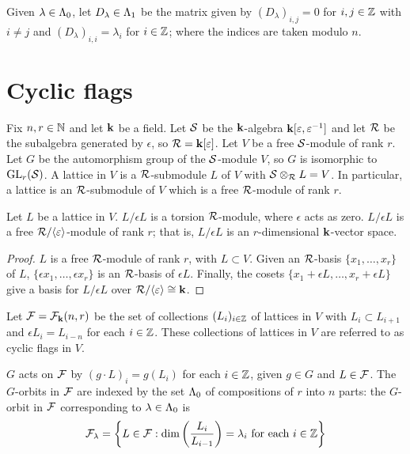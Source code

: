 \documentclass[a4paper, 11pt]{report}
\begin{document}
\begin{definition}\label{def:diagonal-matrices}
Given $\lambda\in{\Lambda_0}$, let $D_\lambda\in{\Lambda_1}$ be the matrix given by $(D_\lambda)_{i,j}=0$ for $i,j\in\mathbb{Z}$ with $i\neq j$ and $(D_\lambda)_{i,i}=\lambda_i$ for $i\in\mathbb{Z}$; where the indices are taken modulo $n$.
\end{definition}

\section{Cyclic flags}

Fix $n,r\in\mathbb{N}$ and let $\mathbf{k}$ be a field. Let $\mathcal{S}$ be the $\mathbf{k}$-algebra $\mathbf{k}[\varepsilon,\varepsilon^{-1}]$ and let $\mathcal{R}$ be the subalgebra generated by $\epsilon$, so $\mathcal{R} = \mathbf{k}[\varepsilon]$. Let $V$ be a free $\mathcal{S}$-module of rank $r$. Let $G$ be the automorphism group of the $\mathcal{S}$-module $V$, so $G$ is isomorphic to $\operatorname{GL}_{r}(\mathcal{S})$. A lattice in $V$ is a $\mathcal{R}$-submodule $L$ of $V$ with $\mathcal{S}\otimes_{\mathcal{R}} L = V$. In particular, a lattice is an $\mathcal{R}$-submodule of $V$ which is a free $\mathcal{R}$-module of rank $r$.

\begin{lemma}
Let $L$ be a lattice in $V$. $L/{\epsilon L}$ is a torsion $\mathcal{R}$-module, where $\epsilon$ acts as zero. $L/{\epsilon L}$ is a free $\mathcal{R}/{\langle \varepsilon \rangle}$-module of rank $r$; that is, $L/{\epsilon L}$ is an $r$-dimensional $\mathbf{k}$-vector space.
\end{lemma}
\begin{proof}
$L$ is a free $\mathcal{R}$-module of rank $r$, with $L\subset V$. Given an $\mathcal{R}$-basis $\{x_1,\ldots,x_r\}$ of $L$, $\{\epsilon x_1,\ldots, \epsilon x_r\}$ is an $\mathcal{R}$-basis of $\epsilon L$. Finally, the cosets $\{ x_1 + \epsilon L,\ldots, x_r + \epsilon L\}$ give a basis for $L/{\epsilon L}$ over $\mathcal{R}/{\langle \varepsilon\rangle}\cong \mathbf{k}$.
\end{proof}


Let $\mathcal{F}=\mathcal{F}_{\mathbf{k}}(n,r)$ be the set of collections $(L_i)_{i\in\mathbb{Z}}$ of lattices in $V$ with $L_i\subset L_{i+1}$ and $\epsilon L_i = L_{i-n}$ for each $i\in\mathbb{Z}$. These collections of lattices in $V$ are referred to as cyclic flags in $V$. 

$G$ acts on $\mathcal{F}$ by $(g\cdot L)_i = g(L_i)$ for each $i\in\mathbb{Z}$, given $g\in G$ and $L\in\mathcal{F}$. The $G$-orbits in $\mathcal{F}$ are indexed by the set ${\Lambda_0}$ of compositions of $r$ into $n$ parts: the $G$-orbit in $\mathcal{F}$ corresponding to $\lambda\in{\Lambda_0}$ is
\begin{equation*}
\mathcal{F}_\lambda = \left\{L\in\mathcal{F}: \dim\left(\frac{L_i}{L_{i-1}}\right) = \lambda_i \text{ for each } i\in\mathbb{Z}\right\}
\end{equation*}
\end{document}

